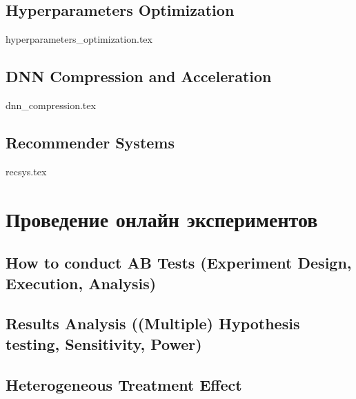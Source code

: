 \documentclass[openany,12pt]{book}
\numberwithin{equation}{section}
\begin{document}
\chapter{Hyperparameters Optimization}
{hyperparameters_optimization.tex}

\chapter{DNN Compression and Acceleration}
{dnn_compression.tex}

\chapter{Recommender Systems}
{recsys.tex}

\part{Проведение онлайн экспериментов}
\chapter{How to conduct AB Tests (Experiment Design, Execution, Analysis)}

\chapter{Results Analysis ((Multiple) Hypothesis testing, Sensitivity, Power)}

\chapter{Heterogeneous Treatment Effect}


% 
% 

\end{document}
